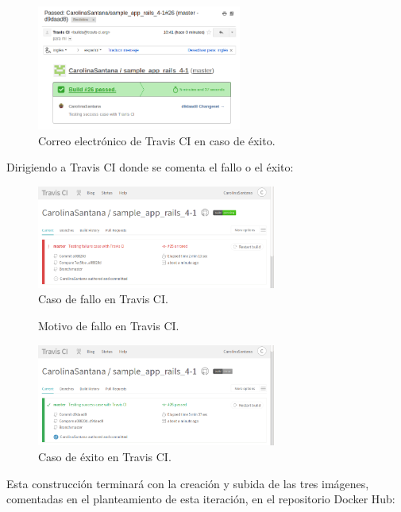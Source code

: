 \begin{figure}[H]
\centering
\includegraphics[width=0.6\textwidth]{images/figures/travissuccess.png}
\caption{Correo electrónico de Travis CI en caso de éxito.}
\end{figure}

Dirigiendo a Travis CI donde se comenta el fallo o el éxito:

\begin{figure}[H]
\centering
\includegraphics[width=0.7\textwidth]{images/figures/travisfailure2.png}
\caption{Caso de fallo en Travis CI.}
\end{figure}

\begin{figure}[H]
\centering
{}
\caption{Motivo de fallo en Travis CI.}
\end{figure}

\begin{figure}[H]
\centering
\includegraphics[width=0.7\textwidth]{images/figures/travissuccess2.png}
\caption{Caso de éxito en Travis CI.}
\end{figure}

Esta construcción terminará con la creación y subida de las tres imágenes, comentadas en el planteamiento de esta iteración, en el repositorio Docker Hub:

